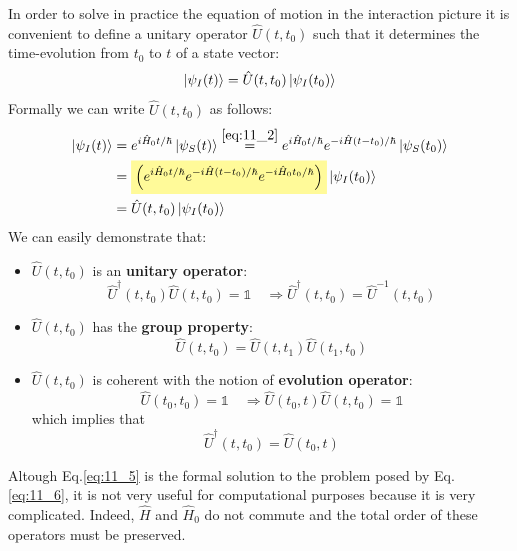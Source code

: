 \documentclass[../main/main.tex]{subfiles}
\begin{document}
In order to solve in practice the equation of motion in the interaction picture it is convenient to define a unitary operator \( \hat{U} (t,t_0)  \) such that it determines the time-evolution from \( t_0 \) to \( t \) of a state vector:
\begin{equation}
  \ket{\psi _I (t)} = \hat{U} (t,t_0) \ket{\psi _I (t_0)}
  \label{eq:11_6}
\end{equation}
Formally we can write \( \hat{U} (t,t_0)  \) as follows:
\begin{equation}
\begin{split}
  \ket{\psi _I (t)} &= e^{i \hat{H}_0 t/ \hbar  } \ket{\psi _S (t)}
  \overset{\eqref{eq:11_2}}{=}   e^{i \hat{H}_0 t/ \hbar  } e^{-i \hat{H} (t-t_0)/ \hbar  } \ket{\psi _S (t_0)} \\
  &= \mathcolorbox{yellow!40}{\qty( e^{i \hat{H}_0 t/ \hbar  }  e^{-i \hat{H} (t-t_0)/ \hbar  }   e^{-i \hat{H}_0 t_0/ \hbar  }   )}  \ket{\psi _I (t_0)} \\
  &= \hat{U} (t,t_0) \ket{\psi _I (t_0)}
\end{split}
\label{eq:11_5}
\end{equation}
We can easily demonstrate that:
\begin{itemize}
\item \( \hat{U} (t,t_0)  \) is an \textbf{unitary operator}:
\begin{equation*}
  \hat{U} ^\dag (t,t_0)\hat{U} (t,t_0) = \mathbb{1} \quad \Rightarrow \hat{U} ^\dag  (t,t_0) = \hat{U}^{-1}  (t,t_0)
\end{equation*}
\item \( \hat{U} (t,t_0) \) has the \textbf{group property}:
\begin{equation*}
  \hat{U} (t,t_0) = \hat{U} (t,t_1)\hat{U} (t_1,t_0)
\end{equation*}
\item \( \hat{U} (t,t_0) \) is coherent with the notion of \textbf{evolution operator}:
\begin{equation*}
  \hat{U} (t_0,t_0) = \mathbb{1} \quad \Rightarrow \hat{U} (t_0,t) \hat{U} (t,t_0) = \mathbb{1}
\end{equation*}
which implies that
\begin{equation*}
    \hat{U} ^\dag (t,t_0) = \hat{U} (t_0,t)
\end{equation*}
\end{itemize}

Altough Eq.\eqref{eq:11_5} is the formal solution to the problem posed by Eq.\eqref{eq:11_6}, it is not very useful for computational purposes because it is very complicated. Indeed, \( \hat{H}  \) and \( \hat{H}_0  \) do not commute and the total order of these operators must be preserved.
\end{document}
